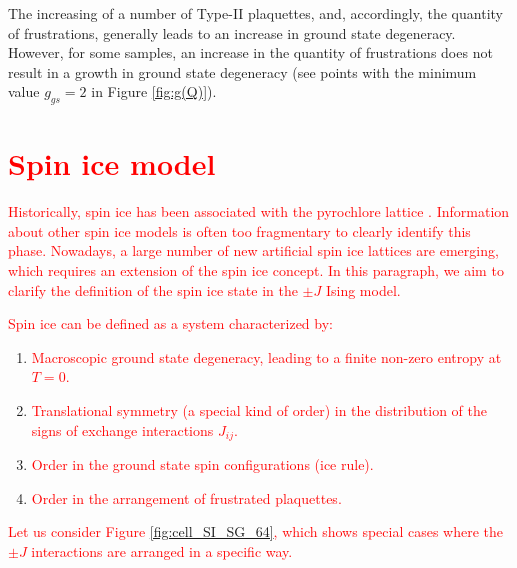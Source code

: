 \documentclass[preprint,12pt]{elsarticle}
\begin{document}
	The increasing of a number of Type-II plaquettes, and, accordingly, the quantity of frustrations, generally leads to an increase in ground state degeneracy. However, for some samples, an increase in the quantity of frustrations does not result in a growth in ground state degeneracy (see points with the minimum value $g_{gs}=2$ in Figure \ref{fig:g(Q)}). 
	
	\section{\textcolor{red}{Spin ice model}}
	
	\textcolor{red}{Historically, spin ice has been associated with the pyrochlore lattice \cite{skjaervo2020advances, bramwell2020history, udagawa2021spin, ortiz2019colloquium, budrikis2021fifty, castelnovo2012spin}. Information about other spin ice models is often too fragmentary to clearly identify this phase. Nowadays, a large number of new artificial spin ice lattices are emerging, which requires an extension of the spin ice concept. In this paragraph, we aim to clarify the definition of the spin ice state in the $\pm J$ Ising model.}

	\textcolor{red}{Spin ice can be defined as a system characterized by:}

	\begin{enumerate}
		\item \textcolor{red}{Macroscopic ground state degeneracy, leading to a finite non-zero entropy at $T = 0$.}
		\item \textcolor{red}{Translational symmetry (a special kind of order) in the distribution of the signs of exchange interactions $J_{ij}$.}
		\item \textcolor{red}{Order in the ground state spin configurations (ice rule).}
		\item \textcolor{red}{Order in the arrangement of frustrated plaquettes.}
	\end{enumerate}
	
	\textcolor{red}{Let us consider Figure \ref{fig:cell_SI_SG_64}, which shows special cases where the $\pm J$ interactions are arranged in a specific way.}
\end{document}

